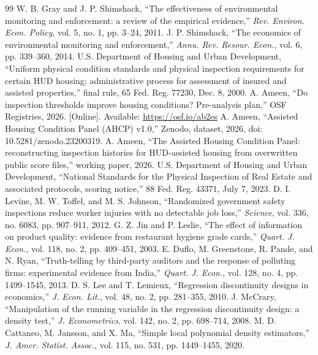 \documentclass[10pt,twocolumn,letterpaper]{article}
\begin{document}
\begin{thebibliography}{99}\footnotesize\setlength{\itemsep}{0pt}\setlength{\parskip}{0pt}
 W. B. Gray and J. P. Shimshack, ``The effectiveness of environmental monitoring and enforcement: a review of the empirical evidence,'' \emph{Rev. Environ. Econ. Policy}, vol. 5, no. 1, pp. 3--24, 2011.
 J. P. Shimshack, ``The economics of environmental monitoring and enforcement,'' \emph{Annu. Rev. Resour. Econ.}, vol. 6, pp. 339--360, 2014.
 U.S. Department of Housing and Urban Development, ``Uniform physical condition standards and physical inspection requirements for certain HUD housing; administrative process for assessment of insured and assisted properties,'' final rule, 65 Fed. Reg. 77230, Dec. 8, 2000.
 A. Ameen, ``Do inspection thresholds improve housing conditions? Pre-analysis plan,'' OSF Registries, 2026. [Online]. Available: \url{https://osf.io/ab2es}
 A. Ameen, ``Assisted Housing Condition Panel (AHCP) v1.0,'' Zenodo, dataset, 2026, doi: 10.5281/zenodo.23200319.
 A. Ameen, ``The Assisted Housing Condition Panel: reconstructing inspection histories for HUD-assisted housing from overwritten public score files,'' working paper, 2026.
 U.S. Department of Housing and Urban Development, ``National Standards for the Physical Inspection of Real Estate and associated protocols, scoring notice,'' 88 Fed. Reg. 43371, July 7, 2023.
 D. I. Levine, M. W. Toffel, and M. S. Johnson, ``Randomized government safety inspections reduce worker injuries with no detectable job loss,'' \emph{Science}, vol. 336, no. 6083, pp. 907--911, 2012.
 G. Z. Jin and P. Leslie, ``The effect of information on product quality: evidence from restaurant hygiene grade cards,'' \emph{Quart. J. Econ.}, vol. 118, no. 2, pp. 409--451, 2003.
 E. Duflo, M. Greenstone, R. Pande, and N. Ryan, ``Truth-telling by third-party auditors and the response of polluting firms: experimental evidence from India,'' \emph{Quart. J. Econ.}, vol. 128, no. 4, pp. 1499--1545, 2013.
 D. S. Lee and T. Lemieux, ``Regression discontinuity designs in economics,'' \emph{J. Econ. Lit.}, vol. 48, no. 2, pp. 281--355, 2010.
 J. McCrary, ``Manipulation of the running variable in the regression discontinuity design: a density test,'' \emph{J. Econometrics}, vol. 142, no. 2, pp. 698--714, 2008.
 M. D. Cattaneo, M. Jansson, and X. Ma, ``Simple local polynomial density estimators,'' \emph{J. Amer. Statist. Assoc.}, vol. 115, no. 531, pp. 1449--1455, 2020.

\end{thebibliography}
\end{document}
